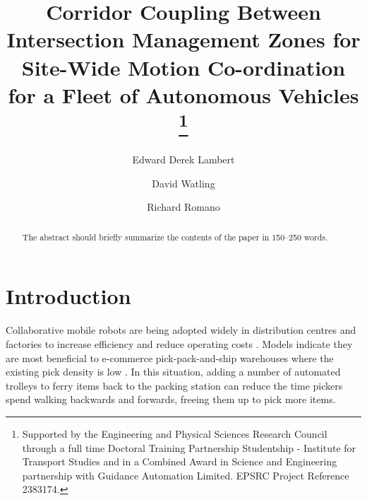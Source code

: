 \documentclass[runningheads]{llncs}
\begin{document}
%
\title{Corridor Coupling Between Intersection Management Zones for Site-Wide Motion Co-ordination for a Fleet of Autonomous Vehicles  
\thanks{Supported by the Engineering and Physical Sciences Research Council  through a full time Doctoral Training Partnership Studentship - Institute for Transport Studies and in a Combined Award in Science and Engineering partnership with Guidance Automation Limited. 
EPSRC Project Reference 2383174. }}
%
%
\author{Edward Derek Lambert \and
David Watling   \and
Richard Romano}
%
%
%
\maketitle              %
%
\begin{abstract}
The abstract should briefly summarize the contents of the paper in
150--250 words.

\end{abstract}
%
%
%
%
%
\section{Introduction}
Collaborative mobile robots are being adopted widely in distribution centres and factories to increase efficiency and reduce operating costs \cite{Azadeh2019}. Models indicate they are most beneficial to e-commerce pick-pack-and-ship warehouses where the existing pick density is low \cite{Meller2018}. In this situation, adding a number of automated trolleys to ferry items back to the packing station can reduce the time pickers spend walking backwards and forwards, freeing them up to pick more items.
\end{document}
